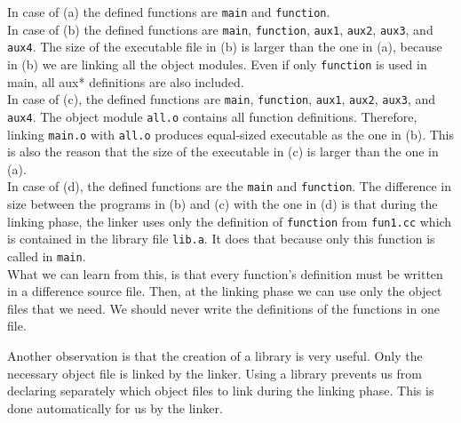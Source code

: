 \documentclass[a4paper]{article}
\newcounter{exerciseCount}
\newcommand{\exercise}[1]{\addtocounter{exerciseCount}{1} \noindent \medskip {\large \textsf{\textbf{Exercise \arabic{exerciseCount} #1}}} \par}
\begin{document}
In case of (a) the defined functions are \verb|main| and \verb|function|.\\

In case of (b) the defined functions are \verb|main|, \verb|function|, \verb|aux1|, \verb|aux2|, \verb|aux3|, and \verb|aux4|. The size of the executable file in (b) is larger than the one in (a), because in (b) we are linking all the object modules. Even if only \verb|function| is used in main, all aux* definitions are also included.\\

In case of (c), the defined functions are \verb|main|, \verb|function|, \verb|aux1|, \verb|aux2|, \verb|aux3|, and \verb|aux4|. The object module \verb|all.o| contains all function definitions. Therefore, linking \verb|main.o| with \verb|all.o| produces equal-sized executable as the one in (b). This is also the reason that the size of the executable in (c) is larger than the one in (a).\\



In case of (d), the defined functions are the \verb|main| and \verb|function|. The difference in size between the programs in (b) and (c) with the one in (d) is that during the linking phase, the linker uses only the definition of \verb|function| from \verb|fun1.cc| which is contained in the library file \verb|lib.a|. It does that because only this function is called in \verb|main|.\\

What we can learn from this, is that every function's definition must be written in a difference source file. Then, at the linking phase we can use only the object files that we need. We should never write the definitions of the functions in one file.

Another observation is that the creation of a library is very useful. Only the necessary object file is linked by the linker. Using a library prevents us from declaring separately which object files to link during the linking phase. This is done automatically for us by the linker.

\vspace{1em}

\exercise{} %
\end{document}
